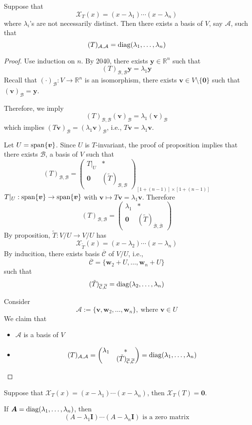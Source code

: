 \begin{proposition}
Suppose that 
\[
\mathcal{X}_T(x) = (x-\lambda_1)\cdots(x-\lambda_n)
\]
where $\lambda_i$'s are not necessarily distinct.
Then there exists a basis of $V$, say $\mathcal{A}$, such that
\[
(T)_{\mathcal{A},\mathcal{A}}=\operatorname{diag}(\lambda_1,\dots,\lambda_n)
\]
\end{proposition}
\begin{proof}
Use induction on $n$.
By 2040, there exists $\bm y\in\mathbb{R}^n$ such that
\[
(T)_{\mathcal{B},\mathcal{B}}\bm y = \lambda_1\bm y
\]
Recall that $(\cdot)_{\mathcal{B}}:V\to\mathbb{R}^n$ is an isomorphism, there exists $\bm v\in V\setminus\{\bm0\}$ such that $(\bm v)_{\mathcal{B}} = \bm y$.

Therefore, we imply
\[
(T)_{\mathcal{B},\mathcal{B}}(\bm v)_{\mathcal{B}} = \lambda_1(\bm v)_{\mathcal{B}}
\]
which implies $(T\bm v)_{\mathcal{B}} = (\lambda_1\bm v)_{\mathcal{B}}$, i.e., $T\bm v = \lambda_1\bm v$.

Let $U=\operatorname{span}\{\bm v\}$.
Since $U$ is $T$-invariant, the proof of proposition implies that there exists $\mathcal{B}$, a basis of $V$ such that
\[
(T)_{\mathcal{B},\mathcal{B}}=\begin{pmatrix}
T|_U&*\\\bm0&(\tilde{T})_{\mathcal{B},\mathcal{B}}
\end{pmatrix}_{[1+(n-1)]\times[1+(n-1)]}
\]
$T|_U:\operatorname{span}\{\bm v\}\to\operatorname{span}\{\bm v\}$ with $\bm v\mapsto T\bm v=\lambda_1\bm v$. Therefore
\[
(T)_{\mathcal{B},\mathcal{B}}=\begin{pmatrix}
\lambda_1&*\\\bm0&(\tilde{T})_{\overline{\mathcal{B}},\overline{\mathcal{B}}}
\end{pmatrix}
\]
By proposition, $\tilde{T}:V/U\to V/U$ has 
\[
\mathcal{X}_{\tilde{T}}(x) = (x-\lambda_2)\cdots(x-\lambda_n)
\]
By inducition, there exists basis $\overline{\mathcal{C}}$ of $V/U$, i.e.,
\[
\overline{\mathcal{C}} = \{\bm w_2+U,\dots,\bm w_n+U\}
\]
such that
\[
(\tilde{T})_{\overline{\mathcal{C}},\overline{\mathcal{C}}}
=
\operatorname{diag}(\lambda_2,\dots,\lambda_n)
\]

Consider
\[
\mathcal{A}:=
\{\bm v,\bm w_2,\dots,\bm w_n\},\ \text{where $\bm v\in U$}
\]
We claim that 
\begin{itemize}
\item
$\mathcal{A}$ is a basis of $V$
\item
\[
(T)_{\mathcal{A},\mathcal{A}}=\begin{pmatrix}
\lambda_1&*\\*&(\tilde{T})_{\overline{\mathcal{C}},\overline{\mathcal{C}}}
\end{pmatrix}=\operatorname{diag}(\lambda_1,\dots,\lambda_n)
\]
\end{itemize}
\end{proof}

\begin{proposition}
Suppose that $\mathcal{X}_T(x) = (x-\lambda_1)\cdots(x-\lambda_n)$, then $\mathcal{X}_T(T)=\bm0$.
\end{proposition}
If $\bm A = \operatorname{diag}(\lambda_1,\dots,\lambda_n)$, then
\[
(A-\lambda_1\bm I)\cdots(A-\lambda_n\bm I)\text{ is a zero matrix}
\]
















